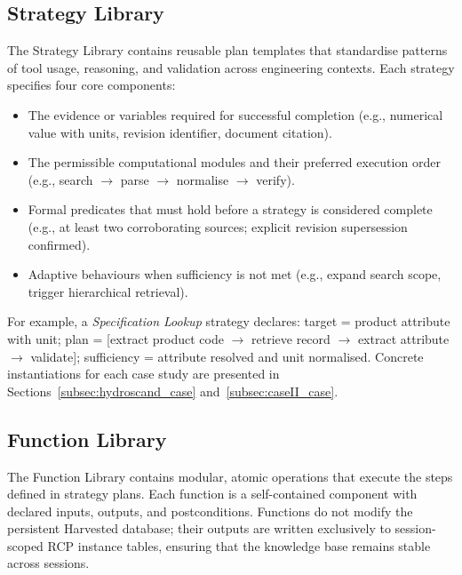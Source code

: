 \documentclass[largeformat]{interact}
\begin{document}
\subsection{Strategy Library}
\label{subsec:strategy_library}
The Strategy Library contains reusable plan templates that standardise patterns of tool usage, reasoning, and validation across engineering contexts. Each strategy specifies four core components:
\begin{itemize}[label=- ]
    \item {} The evidence or variables required for successful completion (e.g., numerical value with units, revision identifier, document citation).
    \item {} The permissible computational modules and their preferred execution order (e.g., search $\rightarrow$ parse $\rightarrow$ normalise $\rightarrow$ verify).
    \item {} Formal predicates that must hold before a strategy is considered complete (e.g., at least two corroborating sources; explicit revision supersession confirmed).
    \item {} Adaptive behaviours when sufficiency is not met (e.g., expand search scope, trigger hierarchical retrieval).
\end{itemize}
For example, a \emph{Specification Lookup} strategy declares: target = product attribute with unit; plan = [extract product code $\rightarrow$ retrieve record $\rightarrow$ extract attribute $\rightarrow$ validate]; sufficiency = attribute resolved and unit normalised. Concrete instantiations for each case study are presented in Sections~\ref{subsec:hydroscand_case} and~\ref{subsec:caseII_case}.

\subsection{Function Library}
\label{subsec:function_library}
The Function Library contains modular, atomic operations that execute the steps defined in strategy plans. Each function is a self-contained component with declared inputs, outputs, and postconditions. Functions do not modify the persistent Harvested database; their outputs are written exclusively to session-scoped RCP instance tables, ensuring that the knowledge base remains stable across sessions.
 
\end{document}
